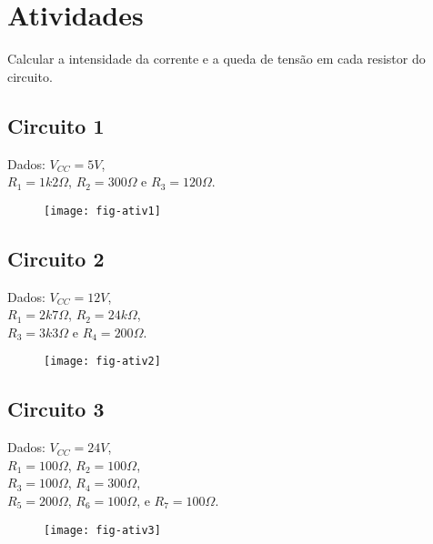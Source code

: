 \section{Atividades}

Calcular a intensidade da corrente e a queda de tensão em cada resistor do circuito.

\subsection{ Circuito 1}
Dados:
$V_{CC} = 5V$, \\
$R_1 = 1k2\Omega$,
$R_2 = 300\Omega$ e
$R_3 = 120\Omega$.
\begin{figure}[H]
  \centering
  \label{fig:ativ1}
  \texttt{[image: fig-ativ1]}
\end{figure}

\subsection{ Circuito 2}
Dados:
$V_{CC} = 12V$, \\
$R_1 = 2k7\Omega$,
$R_2 = 24k\Omega$,\\
$R_3 = 3k3\Omega$ e
$R_4 = 200\Omega$.
\begin{figure}[H]
  \centering
  \label{fig:ativ1}
  \texttt{[image: fig-ativ2]}
\end{figure}

\newpage
\subsection{ Circuito 3}
Dados:
$V_{CC} = 24V$, \\
$R_1 = 100\Omega$,
$R_2 = 100\Omega$,\\
$R_3 = 100\Omega$,
$R_4 = 300\Omega$,\\
$R_5 = 200\Omega$,
$R_6 = 100\Omega$, e
$R_7 = 100\Omega$.
\begin{figure}[H]
  \centering
  \label{fig:ativ1}
  \texttt{[image: fig-ativ3]}
\end{figure}
